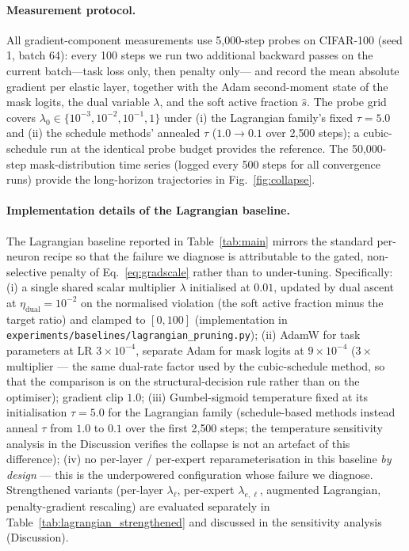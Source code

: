 \documentclass[fleqn,10pt]{article}
\begin{document}
\paragraph{Measurement protocol.} All gradient-component
measurements use 5{,}000-step probes on CIFAR-100 (seed 1,
batch 64): every 100 steps we run two additional backward
passes on the current batch---task loss only, then penalty only---
and record the mean absolute gradient per elastic layer, together
with the Adam second-moment state of the mask logits, the dual
variable $\lambda$, and the soft active fraction $\hat{s}$. The
probe grid covers $\lambda_0 \in \{10^{-3},10^{-2},10^{-1},1\}$
under (i) the Lagrangian family's fixed $\tau{=}5.0$ and (ii) the
schedule methods' annealed $\tau$ ($1.0\!\to\!0.1$ over 2{,}500
steps); a cubic-schedule run at the identical probe budget provides
the reference. The 50{,}000-step mask-distribution time series
(logged every 500 steps for all convergence runs) provide the
long-horizon trajectories in Fig.~\ref{fig:collapse}.

\paragraph{Implementation details of the Lagrangian baseline.} The
Lagrangian baseline reported in Table~\ref{tab:main} mirrors the
standard per-neuron recipe so that the failure we diagnose is
attributable to the gated, non-selective penalty of
Eq.~\ref{eq:gradscale} rather than to under-tuning. Specifically:
(i) a single shared scalar multiplier $\lambda$ initialised at
$0.01$, updated by dual ascent at $\eta_{\mathrm{dual}}{=}10^{-2}$
on the normalised violation (the soft active fraction minus the
target ratio) and clamped to $[0,100]$ (implementation in
\texttt{experiments/baselines/lagrangian\_pruning.py});
(ii) AdamW for task parameters at LR $3\times 10^{-4}$, separate
Adam for mask logits at $9\times 10^{-4}$ ($3\times$ multiplier ---
the same dual-rate factor used by the cubic-schedule method, so
that the comparison is on the structural-decision rule rather than
on the optimiser); gradient clip $1.0$;
(iii) Gumbel-sigmoid temperature fixed at its initialisation
$\tau{=}5.0$ for the Lagrangian family (schedule-based methods
instead anneal $\tau$ from $1.0$ to $0.1$ over the first 2{,}500
steps; the temperature sensitivity analysis in the Discussion
verifies the collapse is not an artefact of this difference);
(iv) no per-layer / per-expert reparameterisation in this baseline
\emph{by design} --- this is the underpowered configuration whose
failure we diagnose. Strengthened variants (per-layer
$\lambda_\ell$, per-expert $\lambda_{e,\ell}$, augmented
Lagrangian, penalty-gradient rescaling) are evaluated separately
in Table~\ref{tab:lagrangian_strengthened} and discussed in the
sensitivity analysis (Discussion).
\end{document}

